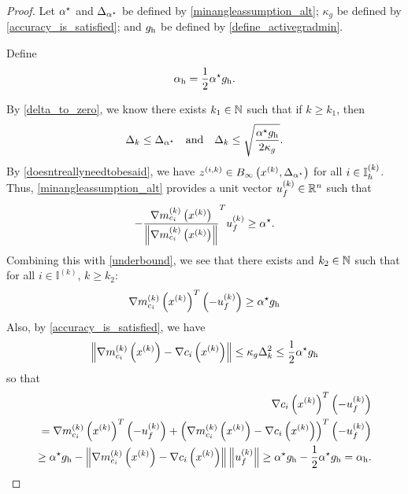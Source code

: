 \begin{proof}

Let 
${ \alpha^{\star} }$ and ${\Delta_{\alpha^{\star}}}$ be defined by \cref{minangleassumption_alt};
$\kappa_g$ be defined by \cref{accuracy_is_satisfied}; 
and ${ g_{\textrm{h}} }$ be defined by \cref{define_activegradmin}.

Define 
\begin{align}
{ \alpha_{\textrm{h}} } = \frac 1 2 { \alpha^{\star} } { g_{\textrm{h}} }. \label{define_minactivealpha}
\end{align}

By \cref{delta_to_zero}, we know there exists $k_1 \in \mathbb N$ such that if $k \ge k_1$, then
\begin{align*}
\Delta_k \le {\Delta_{\alpha^{\star}}} \quad \textrm{and} \quad  \Delta_k \le \sqrt{\frac {{ \alpha^{\star} } { g_{\textrm{h}} }} {2 \kappa_g}}.
\end{align*}
By \cref{doesntreallyneedtobesaid}, we have ${z^{(i, k)}} \in B_{\infty}\left(x^{(k)}, {\Delta_{\alpha^{\star}}} \right)$ for all $i \in { \mathbb I_h^{(k)} }$.
Thus, \cref{minangleassumption_alt} provides a unit vector ${u^{(k)}_f}\in\mathbb R^n$ such that
\begin{align*}
-\frac {{\nabla m_{c_i}^{(k)}\left(x^{(k)}\right)}}{\left\|{\nabla m_{c_i}^{(k)}\left(x^{(k)}\right)}\right\|} ^T{u^{(k)}_f} \ge { \alpha^{\star} }.
\end{align*}
Combining this with \cref{underbound}, we see that there exists and $k_2 \in \mathbb N$ such that for all $i \in \mathbb I^{(k)}$, $k \ge k_2$:
\begin{align*}
 {\nabla m_{c_i}^{(k)}\left(x^{(k)}\right)}^T\left(-{u^{(k)}_f}\right) \ge { \alpha^{\star} } { g_{\textrm{h}} }
\end{align*}
Also, by \cref{accuracy_is_satisfied}, we have
\begin{align*}
\left\|{\nabla m_{c_i}^{(k)}\left(x^{(k)}\right)} - \nabla c_i\left(x^{(k)}\right) \right\| \le \kappa_g \Delta_k^2 \le \frac 1 2 { \alpha^{\star} } { g_{\textrm{h}} }
\end{align*}
so that
\begin{align*}
\nabla c_i\left(x^{(k)}\right)^T \left(-{u^{(k)}_f}\right) \\
= {\nabla m_{c_i}^{(k)}\left(x^{(k)}\right)}^T\left(-{u^{(k)}_f}\right) + \left({\nabla m_{c_i}^{(k)}\left(x^{(k)}\right)} - \nabla c_i\left(x^{(k)}\right) \right)^T\left(-{u^{(k)}_f}\right) \\
\ge { \alpha^{\star} } { g_{\textrm{h}} } - \left\|{\nabla m_{c_i}^{(k)}\left(x^{(k)}\right)} - \nabla c_i\left(x^{(k)}\right) \right\|\left\|{u^{(k)}_f}\right\|
\ge { \alpha^{\star} } { g_{\textrm{h}} } - \frac 1 2 { \alpha^{\star} } { g_{\textrm{h}} } = { \alpha_{\textrm{h}} }.
\end{align*}


\end{proof}
